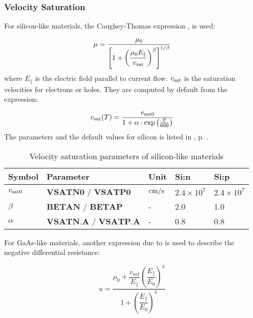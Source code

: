 \documentclass[oneside,12pt]{cgd_book}
\begin{document}
\subsubsection{Velocity Saturation}
\label{sec:Equation:Mobility:Bulk:VSat}
\par
{}For silicon-like materials, the Caughey-Thomas expression
\cite[Caughey1967]{}, is
            used:
\par
\par
\begin{equation}
\mu = \dfrac{\mu _{0} }{\left[ 1 + \left( \dfrac{\mu _{0} E_{\parallel} }{v_{\rm sat} }
            \right)^\beta \right]^{1/\beta} }
\end{equation}
where $E_{\parallel}$ is the electric field parallel to current flow.
$v_{\rm sat}$ is the saturation velocities for electrons or holes. They are
          computed by default from the expression:
\par
\begin{equation}
v_{\rm sat} (T) = \frac{ v_{\rm sat0} }{ 1 + \alpha \cdot \exp \left( \frac{T}{600} \right)
            }
\end{equation}
The parameters and the default values for silicon is listed in ,
p. \pageref{tab:Equation:Vsat:Si:Param}.
\par
\begin{longtable}{lllll}
\caption{\label{tab:Equation:Vsat:Si:Param}Velocity saturation parameters of silicon-like materials} \\
\hline
 Symbol
& Parameter
& Unit
& Si:n
& Si:p\\
\hline
$v_{\rm sat0}$
& $\mathbf{VSATN0}$ / $\mathbf{VSATP0}$
& $\text{cm}\text{/}\text{s}$
& $2.4\times10^7$
& $2.4\times10^7$
\\
 $\beta$
& $\mathbf{BETAN}$ / $\mathbf{BETAP}$
& -
& 2.0
& 1.0
\\
 $\alpha$
& $\mathbf{VSATN.A}$ / $\mathbf{VSATP.A}$
& -
& 0.8
& 0.8\\
\end{longtable}
For GaAs-like materials, another expression due to
\cite[Barnes1976]{} is used to
            describe the negative differential resistance:
\par
\par
\begin{equation}
u = \frac{ \mu _{0} + \dfrac{ v_{sat} }{ E_{\parallel} } \left( \dfrac{E_{\parallel} }{ E_{0} }
            \right)^4 } {1 + \left( \dfrac{E_{\parallel} }{ E_{0} } \right)^4 }
\end{equation}
\end{document}
